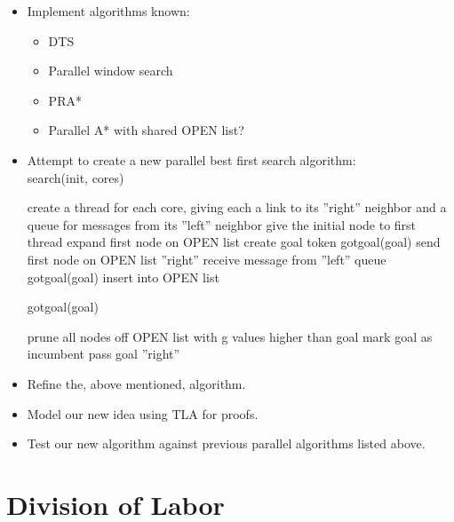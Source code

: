 \documentclass{article}
\begin{document}
\begin{itemize}


\item Implement algorithms known:
  \begin{itemize}
  \item DTS
  \item Parallel window search
  \item PRA*
  \item Parallel A* with shared OPEN list?
  \end{itemize}

\item Attempt to create a new parallel best first search algorithm:\\
  search(init, cores)
\begin{algorithmic}
  \STATE create a thread for each core, giving each a link to its ''right'' neighbor and a queue for messages from its ''left'' neighbor
  \STATE give the initial node to first thread
      \STATE expand first node on OPEN list
        \STATE create goal token
        \STATE gotgoal(goal)
      \ENDIF
    \ENDFOR
    \STATE send first node on OPEN list ''right''
    \STATE receive message from ''left'' queue
      \STATE gotgoal(goal)
      \STATE insert into OPEN list
    \ENDIF
  \ENDWHILE
  \end{algorithmic}
  gotgoal(goal)
  \begin{algorithmic}
        \STATE prune all nodes off OPEN list with g values higher than goal
          \STATE mark goal as incumbent
          \ENDIF
        \STATE pass goal ''right''
      \ENDIF
  \end{algorithmic}

\item Refine the, above mentioned, algorithm.

\item Model our new idea using TLA for proofs.

\item Test our new algorithm against previous parallel algorithms
  listed above.

\end{itemize}

\section{Division of Labor}
\end{document}
